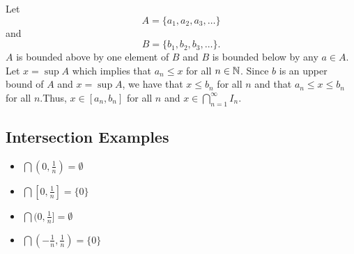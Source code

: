 \documentclass{report}
\begin{document}

\begin{myproof}
  Let $$A=\{a_1, a_2,a_3, \dots\}$$  and $$B=\{b_1,b_2,b_3,
  \dots\}.$$ $A$ is bounded above by one element of $B$ and $B$ is bounded below by any $a \in A$. 
  Let $x = \sup A$ which implies that $a_n \leq x$ for all $n \in \NN$. Since $b$ is an upper bound of $A$ and $x = \sup A$, we have that $ x \leq b_n$ for all $n$ and that $a_n \leq x \leq b_n$ for all $n$.Thus, $x \in [a_n, b_n]$ for all $n$ and $ x \in \bigcap_{n=1}^\infty I_n.$ 
\end{myproof}


\subsection{Intersection Examples}
\begin{itemize}
  \item $\bigcap (0, \frac{1}{n}) = \emptyset$

  \item $\bigcap [0, \frac{1}{n}] = \{0\}$
  \item $\bigcap (0, \frac{1}{n}] = \emptyset$
  \item $\bigcap (-\frac{1}{n}, \frac{1}{n}) = \{0\}$
\end{itemize}

\end{document}
